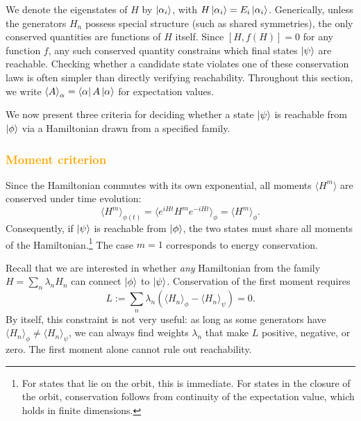 \documentclass[aps,prx,reprint,superscriptaddress,footnote, twocolumn,notitlepage]{revtex4-2}
\newcommand{\ko}[1]{\textcolor{orange}{#1}}
\newcommand{\todoko}[1]{\ko{$\diamondsuit$ #1}}
\begin{document}
We denote the eigenstates of $H$ by $\ket{\alpha_i}$, with $H\ket{\alpha_i} = E_i\ket{\alpha_i}$. Generically, unless the generators $H_n$ possess special structure (such as shared symmetries), the only conserved quantities are functions of $H$ itself. Since $[H, f(H)] = 0$ for any function $f$, any such conserved quantity constrains which final states $\ket{\psi}$ are reachable. Checking whether a candidate state violates one of these conservation laws is often simpler than directly verifying reachability. Throughout this section, we write $\braket{A}_\alpha = \bra{\alpha}A\ket{\alpha}$ for expectation values.

We now present three criteria for deciding whether a state $\ket{\psi}$
 is reachable from $\ket{\phi}$ via a Hamiltonian drawn from a specified family.
\subsubsection{\ko{Moment criterion}}

Since the Hamiltonian commutes with its own exponential, all moments $\langle H^m \rangle$ are conserved under time evolution:
\begin{equation}
    \langle H^m \rangle_{\phi(t)} = \langle e^{iHt} H^m e^{-iHt} \rangle_\phi = \langle H^m \rangle_\phi.
\end{equation}
Consequently, if $\ket{\psi}$ is reachable from $\ket{\phi}$, the two states must share all moments of the Hamiltonian.\footnote{For states that lie on the orbit, this is immediate. For states in the closure of the orbit, conservation follows from continuity of the expectation value, which holds in finite dimensions.} The case $m=1$ corresponds to energy conservation.

Recall that we are interested in whether \emph{any} Hamiltonian from the family $H = \sum_n \lambda_n H_n$ can connect $\ket{\phi}$ to $\ket{\psi}$. Conservation of the first moment requires
\begin{equation}
    L := \sum_n \lambda_n \left( \langle H_n \rangle_\phi - \langle H_n \rangle_\psi \right) = 0.
    \label{eq:first_moment}
\end{equation}
By itself, this constraint is not very useful: as long as some generators have $\langle H_n \rangle_\phi \neq \langle H_n \rangle_\psi$, we can always find weights $\lambda_n$ that make $L$ positive, negative, or zero. The first moment alone cannot rule out reachability.
\end{document}
